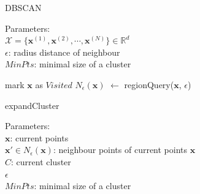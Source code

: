 \begin{algorithm}
\caption{DBSCAN}\label{algo}
Parameters: \\
$\mathcal{X} = \{\mathbf{x}^{(1)},\mathbf{x}^{(2)},\cdots,\mathbf{x}^{(N)}\} \in \mathbb{R}^{d}$\\
$\epsilon$: radius distance of neighbour \\
$MinPts$: minimal size of a cluster
\begin{algorithmic}[1]
{}
\STATE mark $\mathbf{x}$ as $Visited$
\STATE $N_{\epsilon}(\mathbf{x})$ $\gets$ regionQuery($\mathbf{x}$, $\epsilon$)  
\ELSE
\ENDIF
\ENDFOR
\end{algorithmic}
\end{algorithm}

\begin{algorithm}
\caption{expandCluster}\label{alg:expandCluster}
Parameters: \\
$\mathbf{x}$: current points \\
$\mathbf{x'} \in N_{\epsilon}(\mathbf{x})$: neighbour points of current points $\mathbf{x}$ \\
$C$: current cluster \\
$\epsilon$ \\
$MinPts$: minimal size of a cluster
\begin{algorithmic}[1]
{}
    \ENDIF
    \ENDIF
\ENDFOR
\end{algorithmic}
\end{algorithm}

